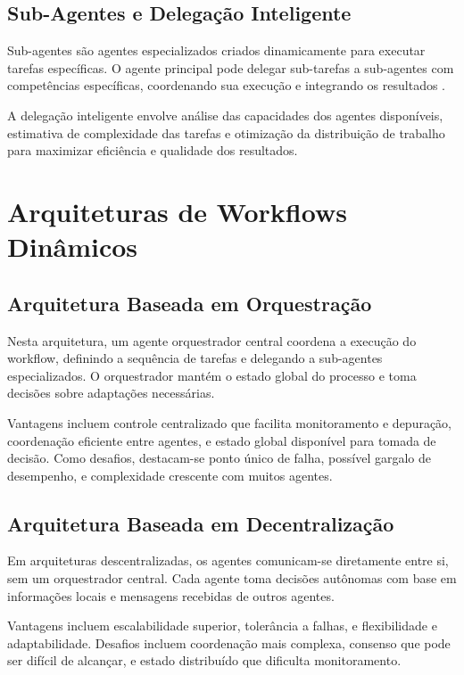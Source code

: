 \documentclass[OA,linenum]{InterPore}
\begin{document}
\subsection{Sub-Agentes e Delegação Inteligente}

Sub-agentes são agentes especializados criados dinamicamente para executar tarefas específicas. O agente principal pode delegar sub-tarefas a sub-agentes com competências específicas, coordenando sua execução e integrando os resultados \cite{tomasev2026}.

A delegação inteligente envolve análise das capacidades dos agentes disponíveis, estimativa de complexidade das tarefas e otimização da distribuição de trabalho para maximizar eficiência e qualidade dos resultados.

\section{Arquiteturas de Workflows Dinâmicos}

\subsection{Arquitetura Baseada em Orquestração}

Nesta arquitetura, um agente orquestrador central coordena a execução do workflow, definindo a sequência de tarefas e delegando a sub-agentes especializados. O orquestrador mantém o estado global do processo e toma decisões sobre adaptações necessárias.

Vantagens incluem controle centralizado que facilita monitoramento e depuração, coordenação eficiente entre agentes, e estado global disponível para tomada de decisão. Como desafios, destacam-se ponto único de falha, possível gargalo de desempenho, e complexidade crescente com muitos agentes.

\subsection{Arquitetura Baseada em Decentralização}

Em arquiteturas descentralizadas, os agentes comunicam-se diretamente entre si, sem um orquestrador central. Cada agente toma decisões autônomas com base em informações locais e mensagens recebidas de outros agentes.

Vantagens incluem escalabilidade superior, tolerância a falhas, e flexibilidade e adaptabilidade. Desafios incluem coordenação mais complexa, consenso que pode ser difícil de alcançar, e estado distribuído que dificulta monitoramento.
\end{document}
